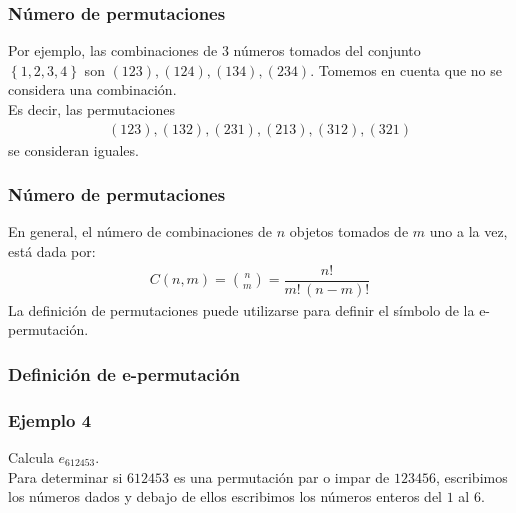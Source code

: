 \documentclass[12pt]{beamer}
\begin{document}
\begin{frame}
\frametitle{Número de permutaciones}
Por ejemplo, las combinaciones de $3$ números tomados del conjunto \\ $\left\{ 1, 2, 3, 4 \right\}$ son $(123), (124), (134), (234)$. Tomemos en cuenta que no se considera una combinación.
\\
\bigskip
\pause
Es decir, las permutaciones
\begin{align*}
(123), (132), (231), (213), (312), (321)
\end{align*}
se consideran iguales.
\end{frame}
\begin{frame}
\frametitle{Número de permutaciones}
En general, el número de combinaciones de $n$ objetos tomados de $m$ uno a la vez, está dada por:
\begin{align*}
C(n, m) = \binom{n}{m} = \dfrac{n!}{m! \, (n - m)!}
\end{align*}
La definición de permutaciones puede utilizarse para definir el símbolo de la e-permutación.
\end{frame}
\begin{frame}[fragile]
\frametitle{Definición de e-permutación}
\end{frame}
\begin{frame}
\frametitle{Ejemplo 4}
Calcula $e_{612453}$.
\\
\bigskip
\pause
Para determinar si $612453$ es una permutación par o impar de $123456$, escribimos los números dados y debajo de ellos escribimos los números enteros del $1$ al $6$.
\end{frame}
\end{document}
